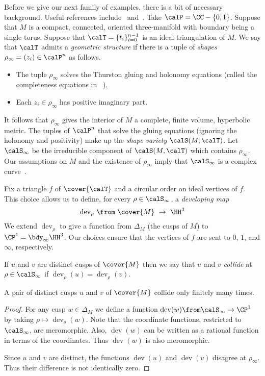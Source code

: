 \documentclass[12pt]{amsart}
\newcommand{\dev}{\operatorname{dev}}
\begin{document}
Before we give our next family of examples, there is a bit of necessary background.  Useful references include~\cite[Chapter~4]{thurston_notes} and~\cite[Section~2]{Tillmann12}.  Take $\calP = \CC - \{0, 1\}$.  
Suppose that $M$ is a compact, connected, oriented three-manifold with boundary being a single torus.  Suppose that $\calT = \{t_i\}_{i = 0}^{n-1}$ is an ideal triangulation of $M$.  We say that $\calT$ admits a \emph{geometric structure} if there is a tuple of \emph{shapes} $\rho_\infty = (z_i) \in \calP^n$ as follows.
\begin{itemize}
\item
The tuple $\rho_\infty$ solves the Thurston gluing and holonomy equations (called the completeness equations in ~\cite[page~800]{Tillmann12}). 
\item
Each $z_i \in \rho_\infty$ has positive imaginary part. 
\end{itemize}
It follows that $\rho_\infty$ gives the interior of $M$ a complete, finite volume, hyperbolic metric.  The tuples of $\calP^n$ that solve the gluing equations (ignoring the holonomy and positivity) make up the \emph{shape variety} $\calS(M, \calT)$.  
Let $\calS_\infty$ be the irreducible component of $\calS(M, \calT)$ which contains $\rho_\infty$.  Our assumptions on $M$ and the existence of $\rho_\infty$ imply that $\calS_\infty$ is a complex curve~\cite[page~314]{NeumannZagier85}.  

Fix a triangle $f$ of $\cover{\calT}$ and a circular order on ideal vertices of $f$.  This choice allows us to define, for every $\rho \in \calS_\infty$, a \emph{developing map} 
\[
\dev_{\rho} \, \from \,\, \cover{M} \,\, \to \,\, \HH^3
\]
We extend $\dev_\rho$ to give a function from $\Delta_M$ (the cusps of $M$) to $\CP^1 = \bdy_\infty \HH^3$.  Our choices ensure that the vertices of $f$ are sent to $0$, $1$, and $\infty$, respectively. 

\begin{definition}
\label{Def:Collide}
If $u$ and $v$ are distinct cusps of $\cover{M}$ then we say that $u$ and $v$ \emph{collide} at $\rho \in \calS_\infty$ if $\dev_\rho(u) = \dev_\rho(v)$. 
\end{definition}

\begin{lemma}
\label{Lem:FiniteCollisions}
A pair of distinct cusps $u$ and $v$ of $\cover{M}$ collide only finitely many times. 
\end{lemma}


\begin{proof}
For any cusp $w \in \Delta_M$ we define a function $\dev(w) \from \calS_\infty \to \CP^1$ by taking $\rho \mapsto \dev_\rho(w)$.  Note that the coordinate functions, restricted to $\calS_\infty$, are meromorphic.  Also, $\dev(w)$ can be written as a rational function in terms of the coordinates.  Thus $\dev(w)$ is also meromorphic. 

Since $u$ and $v$ are distinct, the functions $\dev(u)$ and $\dev(v)$ disagree at $\rho_\infty$.  Thus their difference is not identically zero. 
\end{proof}
\end{document}
